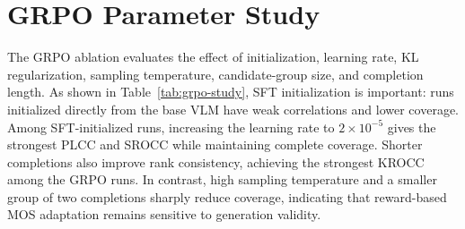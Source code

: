 \begin{table}[t]
  \centering
  \caption{SFT ablation study around a rank-16 reference configuration. All runs have 100\% prediction coverage.}
  \label{tab:sft-study}
  \scriptsize
  \setlength{\tabcolsep}{2pt}
\end{table}

\section{GRPO Parameter Study}
The GRPO ablation evaluates the effect of initialization, learning rate, KL regularization, sampling temperature, candidate-group size, and completion length. As shown in Table~\ref{tab:grpo-study}, SFT initialization is important: runs initialized directly from the base VLM have weak correlations and lower coverage. Among SFT-initialized runs, increasing the learning rate to $2{\times}10^{-5}$ gives the strongest PLCC and SROCC while maintaining complete coverage. Shorter completions also improve rank consistency, achieving the strongest KROCC among the GRPO runs. In contrast, high sampling temperature and a smaller group of two completions sharply reduce coverage, indicating that reward-based MOS adaptation remains sensitive to generation validity.

